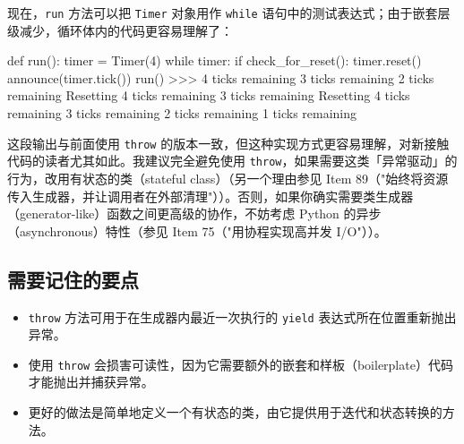 现在，\texttt{run} 方法可以把 \texttt{Timer} 对象用作 \texttt{while} 语句中的测试表达式；由于嵌套层级减少，循环体内的代码更容易理解了：

\begin{codebox}[python]
def run():
    timer = Timer(4)
    while timer:
        if check_for_reset():
            timer.reset()
        announce(timer.tick())
run()
>>>
4 ticks remaining
3 ticks remaining
2 ticks remaining
Resetting
4 ticks remaining
3 ticks remaining
Resetting
4 ticks remaining
3 ticks remaining
2 ticks remaining
1 ticks remaining
\end{codebox}

这段输出与前面使用 \texttt{throw} 的版本一致，但这种实现方式更容易理解，对新接触代码的读者尤其如此。我建议完全避免使用 \texttt{throw}，如果需要这类「异常驱动」的行为，改用有状态的类（stateful class）（另一个理由参见 Item 89（"始终将资源传入生成器，并让调用者在外部清理"））。否则，如果你确实需要类生成器（generator-like）函数之间更高级的协作，不妨考虑 Python 的异步（asynchronous）特性（参见 Item 75（"用协程实现高并发 I/O"））。

\subsection{需要记住的要点}

\begin{itemize}
\item \texttt{throw} 方法可用于在生成器内最近一次执行的 \texttt{yield} 表达式所在位置重新抛出异常。
\item 使用 \texttt{throw} 会损害可读性，因为它需要额外的嵌套和样板（boilerplate）代码才能抛出并捕获异常。
\item 更好的做法是简单地定义一个有状态的类，由它提供用于迭代和状态转换的方法。
\end{itemize}
